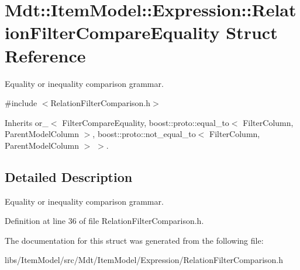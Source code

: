 \hypertarget{struct_mdt_1_1_item_model_1_1_expression_1_1_relation_filter_compare_equality}{}\section{Mdt\+:\+:Item\+Model\+:\+:Expression\+:\+:Relation\+Filter\+Compare\+Equality Struct Reference}
\label{struct_mdt_1_1_item_model_1_1_expression_1_1_relation_filter_compare_equality}


Equality or inequality comparison grammar.  




{\ttfamily \#include $<$Relation\+Filter\+Comparison.\+h$>$}



Inherits or\+\_\+$<$ Filter\+Compare\+Equality, boost\+::proto\+::equal\+\_\+to$<$ Filter\+Column, Parent\+Model\+Column $>$, boost\+::proto\+::not\+\_\+equal\+\_\+to$<$ Filter\+Column, Parent\+Model\+Column $>$ $>$.



\subsection{Detailed Description}
Equality or inequality comparison grammar. 

Definition at line 36 of file Relation\+Filter\+Comparison.\+h.



The documentation for this struct was generated from the following file\+:\begin{DoxyCompactItemize}
\item 
libs/\+Item\+Model/src/\+Mdt/\+Item\+Model/\+Expression/Relation\+Filter\+Comparison.\+h\end{DoxyCompactItemize}
